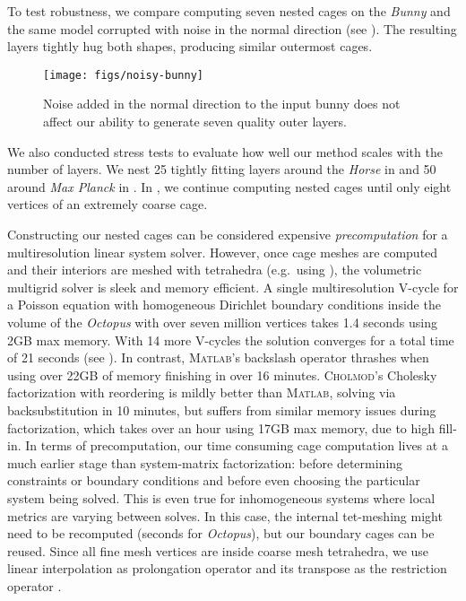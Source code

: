 To test robustness, we compare computing seven nested cages on the \emph{Bunny}
and the same model corrupted with noise in the normal direction (see
). The resulting layers tightly hug both shapes, producing
similar outermost cages.

\begin{figure}
  \texttt{[image: figs/noisy-bunny]}
  \caption{Noise added in the normal direction to the input bunny does not
  affect our ability to generate seven quality outer layers.}
  \label{fig:noisy-bunny}
\end{figure}

We also conducted stress tests to evaluate how well our method scales with the
number of layers. We nest 25 tightly fitting layers around the \emph{Horse} in
 and 50 around \emph{Max Planck} in .
%
In , we continue computing nested cages until only eight
vertices of an extremely coarse cage.

%
Constructing our nested cages can be considered expensive \emph{precomputation}
for a multiresolution linear system solver.
%
However, once cage meshes are computed and their interiors are meshed with
tetrahedra (e.g.\ using \cite{tetgen}),
the volumetric multigrid solver is sleek and memory efficient.
%
A single multiresolution V-cycle for a Poisson equation with homogeneous
Dirichlet boundary conditions inside the volume of the \emph{Octopus} with over
seven million vertices takes 1.4 seconds using 2GB max memory. With 14 more
V-cycles the solution converges for a total time of 21 seconds (see
).
%
In contrast, \textsc{Matlab}'s backslash operator thrashes when using over 22GB
of memory finishing in over 16 minutes.
%
\textsc{Cholmod}'s Cholesky factorization with reordering is mildly better than
\textsc{Matlab}, solving via backsubstitution in 10 minutes, but suffers from
similar memory issues during factorization, which takes over
an hour using 17GB max memory, due to high fill-in.
%
In terms of precomputation, our time consuming cage computation lives at a much
earlier stage than system-matrix factorization: before determining constraints
or boundary conditions and before even choosing the particular system being
solved.
%
This is even true for inhomogeneous systems where local metrics are
varying between solves. In this case, the internal tet-meshing might need to be
recomputed (seconds for \emph{Octopus}), but our boundary cages can be reused.
%
Since all fine mesh vertices are inside coarse mesh tetrahedra, we use linear
interpolation as prolongation operator and its transpose as the restriction
operator \cite{Demmel04}.

